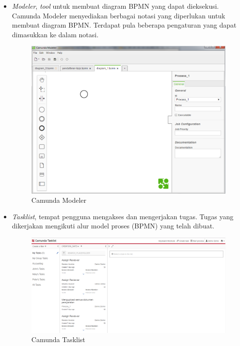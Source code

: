 \begin{itemize}
	\item \textit{Modeler}, \textit{tool} untuk membuat diagram BPMN yang dapat dieksekusi. Camunda Modeler menyediakan berbagai notasi yang diperlukan untuk membuat diagram BPMN. Terdapat pula beberapa pengaturan yang dapat dimasukkan ke dalam notasi.
		\begin{figure}[H]
			\centering
			\includegraphics[scale=0.4]{Gambar/Bab-2/bpms/camundaModeler}
			\caption{Camunda Modeler} 
			\label{fig:camundamodeler}
		\end{figure}
	
	\item \textit{Tasklist}, tempat pengguna mengakses dan mengerjakan tugas. Tugas yang dikerjakan mengikuti alur model proses (BPMN) yang telah dibuat. 
		\begin{figure}[H]
			\centering
			\includegraphics[scale=0.4]{Gambar/Bab-2/bpms/camundaTaskList}
			\caption{Camunda Tasklist} 
			\label{fig:camundatasklist}
		\end{figure}
	

\end{itemize}
